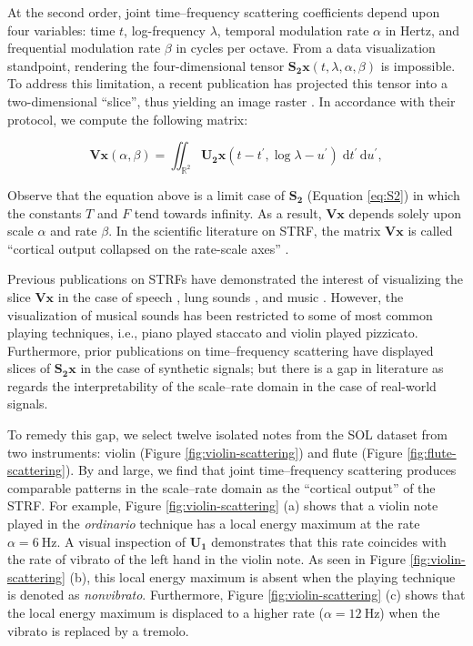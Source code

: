\documentclass{bmcart}
\begin{document}
At the second order, joint time--frequency scattering coefficients depend upon four variables: time $t$, log-frequency $\lambda$, temporal modulation rate $\alpha$ in Hertz, and frequential modulation rate $\beta$ in cycles per octave.
From a data visualization standpoint, rendering the four-dimensional tensor $\mathbf{S_2}\boldsymbol{x}(t, \lambda, \alpha, \beta)$ is impossible.
To address this limitation, a recent publication has projected this tensor into a two-dimensional ``slice'', thus yielding an image raster \cite{anden2019tsp}.
In accordance with their protocol, we compute the following matrix:

\begin{equation}
\mathbf{V}\boldsymbol{x}(\alpha, \beta) =
\iint_{\mathbb{R}^2}
\mathbf{U_2}\boldsymbol{x}(t - t^\prime, \log \lambda - u^\prime)
\;\mathrm{d}t^\prime \, \mathrm{d}u^\prime,
\end{equation}

Observe that the equation above is a limit case of $\mathbf{S_2}$ (Equation \ref{eq:S2}) in which the constants $T$ and $F$ tend towards infinity.
As a result, $\mathbf{V}\boldsymbol{x}$ depends solely upon scale $\alpha$ and rate $\beta$.
In the scientific literature on STRF, the matrix $\mathbf{V}\boldsymbol{x}$ is called ``cortical output collapsed on the rate-scale axes'' \cite{elhilali2003speechcomm}.

Previous publications on STRFs have demonstrated the interest of visualizing the slice $\mathbf{V}\boldsymbol{x}$ in the case of speech \cite{bellur2015ciss}, lung sounds \cite{emmanouilidou2012embs}, and music \cite{patil2012ploscompbiol}.
However, the visualization of musical sounds has been restricted to some of most common playing techniques, i.e., piano played staccato and violin played pizzicato.
Furthermore, prior publications on time--frequency scattering have displayed slices of $\mathbf{S_2}\boldsymbol{x}$ in the case of synthetic signals; but there is a gap in literature as regards the interpretability of the scale--rate domain in the case of real-world signals.

To remedy this gap, we select twelve isolated notes from the SOL dataset from two instruments: violin (Figure \ref{fig:violin-scattering}) and flute (Figure \ref{fig:flute-scattering}).
By and large, we find that joint time--frequency scattering produces comparable patterns in the scale--rate domain as the ``cortical output'' of the STRF.
For example, Figure \ref{fig:violin-scattering} (a) shows that a violin note played in the \emph{ordinario} technique has a local energy maximum at the rate $\alpha = \SI{6}{\hertz}$.
A visual inspection of $\mathbf{U_1}$ demonstrates that this rate coincides with the rate of vibrato of the left hand in the violin note.
As seen in Figure \ref{fig:violin-scattering} (b), this local energy maximum is absent when the playing technique is denoted as \emph{nonvibrato}.
Furthermore, Figure \ref{fig:violin-scattering} (c) shows that the local energy maximum is displaced to a higher rate ($\alpha = \SI{12}{\hertz}$) when the vibrato is replaced by a tremolo.
\end{document}
